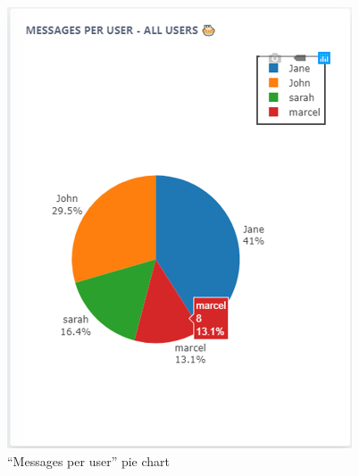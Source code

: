 \documentclass{article}
\begin{document}
\vspace{10pt}
\begin{figure}[H]
\centering
\begin{minipage}{.5\textwidth}
  \centering
  \includegraphics[width=1\linewidth]{charts/pie.png}
  \caption{``Messages per user'' pie chart}
  \label{fig:pie}
\end{minipage}%
\begin{minipage}{.5\textwidth}
  \centering

\end{minipage}
\end{figure}
\end{document}
